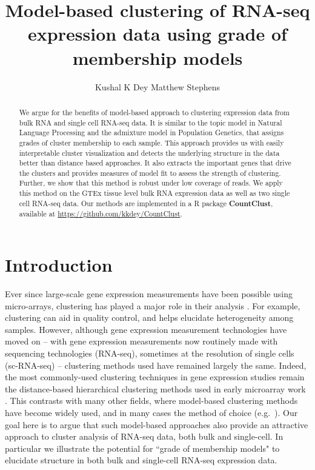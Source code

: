 \title{\Large{\textbf{Model-based clustering of RNA-seq expression data using grade of membership models}}}
\author{ Kushal K Dey  \qquad Matthew Stephens}

\maketitle

\begin{abstract}
We argue for the benefits of model-based approach to clustering expression data from bulk RNA and single cell RNA-seq data. It is similar to the topic model in Natural Language Processing and the admixture model in Population Genetics, that assigns grades of cluster membership to each sample. This approach provides us with easily interpretable cluster visualization  and  detects the underlying structure in the data better than distance based approaches. It also extracts the important genes that drive the clusters and provides measures of model fit to assess the strength of clustering. Further, we show that this method is robust under low coverage of reads. We apply this method on the GTEx tissue level bulk RNA expression data as well as two single cell RNA-seq data. Our methods are implemented in a R package \textbf{CountClust}, available at \url{https://github.com/kkdey/CountClust}.
\end{abstract}

\section{Introduction}

Ever since large-scale gene expression measurements have been possible using micro-arrays, clustering has played a major role in their analysis \cite{Eisen1998}.
For example, clustering can aid in quality control, and helps elucidate heterogeneity among samples. However, although gene expression 
measurement technologies have moved on -- with gene expression measurements now routinely made with sequencing technologies (RNA-seq), sometimes at the resolution of single cells (sc-RNA-seq) -- clustering methods used have remained largely the same. Indeed, the most commonly-used clustering techniques in gene expression studies
remain the distance-based hierarchical clustering 
methods used in early microarray work \cite{Eisen1998}. This contrasts with many other fields, where model-based clustering methods
have become widely used, and in many cases the method of choice (e.g.~\cite{Pritchard2000}). Our goal here
is to argue that such model-based approaches also provide an attractive approach to cluster analysis of RNA-seq data, both bulk and single-cell.
In particular we illustrate the potential for ``grade of membership models" \cite{Erosheva2006} to elucidate structure in both bulk and single-cell RNA-seq expression data. 


